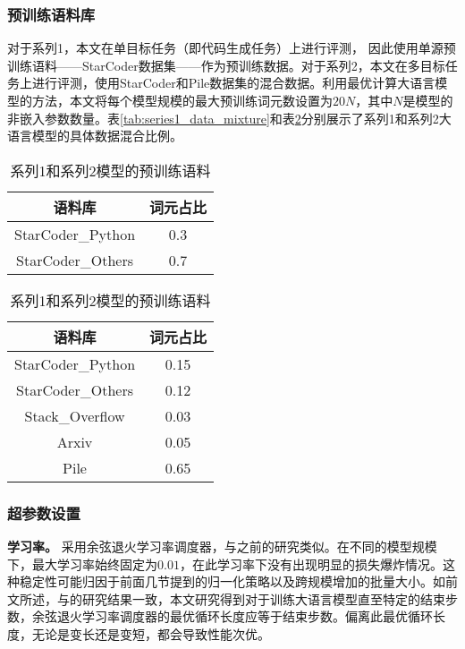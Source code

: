 \subsubsection{预训练语料库}
对于系列1，本文在单目标任务（即代码生成任务）上进行评测， 因此使用单源预训练语料——StarCoder数据集\citep{li2023starcoder}——作为预训练数据。对于系列2，本文在多目标任务上进行评测，使用StarCoder和Pile数据集\citep{gao2020pile}的混合数据。利用最优计算大语言模型的方法\citep{hoffmann2022training}，本文将每个模型规模的最大预训练词元数设置为\(20N\)，其中\(N\)是模型的非嵌入参数数量。表\ref{tab:series1_data_mixture}和表\ref{tab:series2_data_mixture}分别展示了系列1和系列2大语言模型的具体数据混合比例。

\begin{table}
    \centering
    \caption{系列1和系列2模型的预训练语料}
    \begin{minipage}{0.45\linewidth}
        \centering
        \begin{tabular}{c|c}
        \toprule
           语料库   &  词元占比 \\
        \midrule
        StarCoder\_Python &  0.3\\
        StarCoder\_Others &  0.7\\
        \bottomrule
        \end{tabular}
        \label{tab:series1_data_mixture}
    \end{minipage}
    \hfill
    \begin{minipage}{0.45\linewidth}
        \centering
        \begin{tabular}{c|c}
        \toprule
           语料库   &  词元占比 \\
        \midrule
        StarCoder\_Python &  0.15\\
        StarCoder\_Others &  0.12\\
        Stack\_Overflow & 0.03 \\
        Arxiv & 0.05 \\
        Pile & 0.65 \\
        \bottomrule
        \end{tabular}
        \label{tab:series2_data_mixture}
    \end{minipage}
\end{table}

\subsubsection{超参数设置}
\label{app:hyperparameters}
\textbf{学习率。} 采用余弦退火学习率调度器，与之前的研究\citep{touvron2023llama, touvron2023llama2, hoffmann2022training}类似。在不同的模型规模下，最大学习率始终固定为\(0.01\)，在此学习率下没有出现明显的损失爆炸情况。这种稳定性可能归因于前面几节提到的归一化策略\citep{yang2022tensor}以及跨规模增加的批量大小。如前文所述，与\citet{hoffmann2022training}的研究结果一致，本文研究得到对于训练大语言模型直至特定的结束步数，余弦退火学习率调度器的最优循环长度应等于结束步数。偏离此最优循环长度，无论是变长还是变短，都会导致性能次优。


